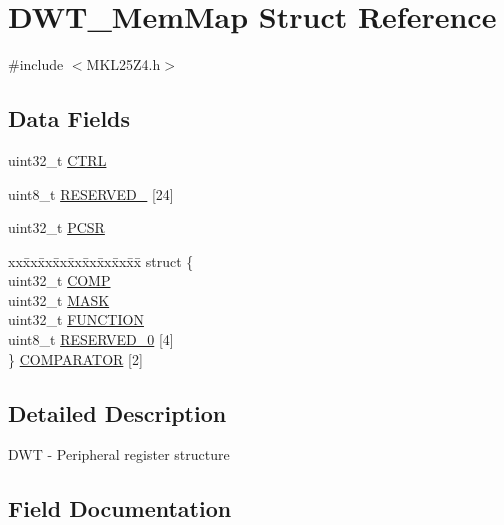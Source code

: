 \hypertarget{struct_d_w_t___mem_map}{}\section{D\+W\+T\+\_\+\+Mem\+Map Struct Reference}
\label{struct_d_w_t___mem_map}


{\ttfamily \#include $<$M\+K\+L25\+Z4.\+h$>$}

\subsection*{Data Fields}
\begin{DoxyCompactItemize}
\item 
uint32\+\_\+t \hyperlink{struct_d_w_t___mem_map_a3be6514ca3bd369fd0de9f8f49471179}{C\+T\+RL}
\item 
uint8\+\_\+t \hyperlink{struct_d_w_t___mem_map_a3c335221b719dd64f44cd8f400d5d09f}{R\+E\+S\+E\+R\+V\+E\+D\+\_} \mbox{[}24\mbox{]}
\item 
uint32\+\_\+t \hyperlink{struct_d_w_t___mem_map_a631b6ac4a2a7ea845ce82f685d1e0d97}{P\+C\+SR}
\item 
\begin{tabbing}
xx\=xx\=xx\=xx\=xx\=xx\=xx\=xx\=xx\=\kill
struct \{\\
\>uint32\_t \hyperlink{struct_d_w_t___mem_map_aa1352530035b6609791c19fda0cc2fb6}{COMP}\\
\>uint32\_t \hyperlink{struct_d_w_t___mem_map_a33f6052ebf71e72af18f19c6edadafc4}{MASK}\\
\>uint32\_t \hyperlink{struct_d_w_t___mem_map_a4ae89e85dc3ace1cb39550b918afadd9}{FUNCTION}\\
\>uint8\_t \hyperlink{struct_d_w_t___mem_map_a3c335221b719dd64f44cd8f400d5d09f}{RESERVED\_0} \mbox{[}4\mbox{]}\\
\} \hyperlink{struct_d_w_t___mem_map_ae5e3a5e925a194cadcd9739c44445e99}{COMPARATOR} \mbox{[}2\mbox{]}\\

\end{tabbing}\end{DoxyCompactItemize}


\subsection{Detailed Description}
D\+WT -\/ Peripheral register structure 

\subsection{Field Documentation}
\mbox{\label{struct_d_w_t___mem_map_aa1352530035b6609791c19fda0cc2fb6}} 
